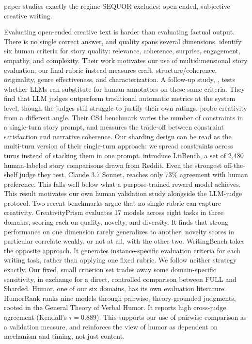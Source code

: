 paper studies exactly the regime SEQUOR excludes: open-ended, subjective creative writing.

Evaluating open-ended creative text is harder than evaluating factual output. There is no single correct answer, and quality spans several dimensions. \citet{chhun2022humancriteriaautomaticmetrics} identify six human criteria for story quality: relevance, coherence, surprise, engagement, empathy, and complexity. Their work motivates our use of multidimensional story evaluation; our final rubric instead measures craft, structure/coherence, originality, genre effectiveness, and characterization. A follow-up study, \citet{chhun-etal-2024-language}, tests whether LLMs can substitute for human annotators on these same criteria. They find that LLM judges outperform traditional automatic metrics at the system level, though the judges still struggle to justify their own ratings. \citet{atmakuru2024cs4measuringcreativitylarge} probe creativity from a different angle. Their CS4 benchmark varies the number of constraints in a single-turn story prompt, and measures the trade-off between constraint satisfaction and narrative coherence. Our sharding design can be read as the multi-turn version of their single-turn approach: we spread constraints across turns instead of stacking them in one prompt. \citet{fein2025litbenchbenchmarkdatasetreliable} introduce LitBench, a set of 2{,}480 human-labeled story comparisons drawn from Reddit. Even the strongest off-the-shelf judge they test, Claude 3.7 Sonnet, reaches only 73\% agreement with human preference. This falls well below what a purpose-trained reward model achieves. This result motivates our own human validation study alongside the LLM-judge protocol. Two recent benchmarks argue that no single rubric can capture creativity. CreativityPrism \citep{hou2026creativityprismcrossdomainevaluationframework} evaluates 17 models across eight tasks in three domains, scoring each on quality, novelty, and diversity. It finds that strong performance on one dimension rarely generalizes to another; novelty scores in particular correlate weakly, or not at all, with the other two. WritingBench \citep{wu2025writingbenchcomprehensivebenchmarkgenerative} takes the opposite approach. It generates instance-specific evaluation criteria for each writing task, rather than applying one fixed rubric. We follow neither strategy exactly. Our fixed, small criterion set trades away some domain-specific sensitivity, in exchange for a direct, controlled comparison between FULL and Sharded. Humor, one of our six domains, has its own evaluation literature. HumorRank \citep{ajayi2026humorranktournamentbasedleaderboardevaluating} ranks nine models through pairwise, theory-grounded judgments, rooted in the General Theory of Verbal Humor. It reports high cross-judge agreement (Kendall's $\tau = 0.889$). This supports our use of pairwise comparison as a validation measure, and reinforces the view of humor as dependent on mechanism and timing, not just content.

